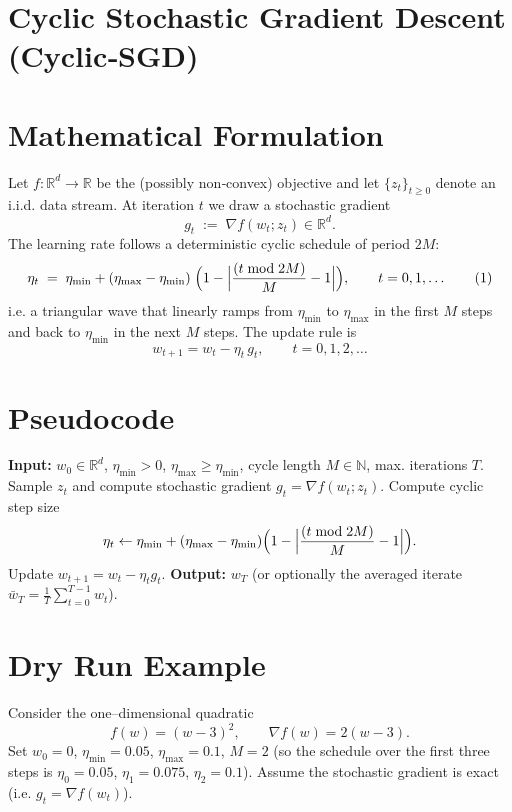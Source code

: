 \documentclass{article}
\newcommand{\RR}{\mathbb{R}}
\begin{document}
\section*{Cyclic Stochastic Gradient Descent (Cyclic‑SGD)}

\section*{Mathematical Formulation}
Let $f:\RR^{d}\rightarrow\RR$ be the (possibly non‑convex) objective and let 
$\{z_{t}\}_{t\ge0}$ denote an i.i.d. data stream.  
At iteration $t$ we draw a stochastic gradient
\[
g_{t}\;:=\;\nabla f(w_{t};z_{t})\in\RR^{d}.
\]
The learning rate follows a deterministic cyclic schedule of period $2M$:
\[
\eta_{t}\;=\;\eta_{\min}
   +(\eta_{\max}-\eta_{\min})\;
      \Bigl(1-\Bigl|\frac{(t\bmod 2M)}{M}-1\Bigr|\Bigr),
   \qquad t=0,1,\dots
\tag{1}
\]
i.e. a triangular wave that linearly ramps from $\eta_{\min}$ to $\eta_{\max}$
in the first $M$ steps and back to $\eta_{\min}$ in the next $M$ steps.
The update rule is
\[
w_{t+1}=w_{t}-\eta_{t}\,g_{t},\qquad t=0,1,2,\dots
\tag{2}
\]

\section*{Pseudocode}
\begin{algorithm}[H]
\caption{Cyclic‑SGD}
\begin{algorithmic}[1]
\STATE \textbf{Input:} $w_{0}\in\RR^{d}$, $\eta_{\min}>0$, $\eta_{\max}\ge\eta_{\min}$, cycle length $M\in\mathbb N$,
max. iterations $T$.
    \STATE Sample $z_{t}$ and compute stochastic gradient $g_{t}=\nabla f(w_{t};z_{t})$.
    \STATE Compute cyclic step size
    \[
    \eta_{t}\leftarrow \eta_{\min}+(\eta_{\max}-\eta_{\min})
                \Bigl(1-\Bigl|\frac{(t\bmod 2M)}{M}-1\Bigr|\Bigr).
    \]
    \STATE Update $w_{t+1}=w_{t}-\eta_{t} g_{t}$.
\ENDFOR
\STATE \textbf{Output:} $w_{T}$ (or optionally the averaged iterate $\bar w_T=\frac1T\sum_{t=0}^{T-1}w_{t}$).
\end{algorithmic}
\end{algorithm}

\section*{Dry Run Example}
Consider the one–dimensional quadratic
\[
f(w)=(w-3)^{2},\qquad \nabla f(w)=2(w-3).
\]
Set $w_{0}=0$, $\eta_{\min}=0.05$, $\eta_{\max}=0.1$, $M=2$ (so the schedule over the first three steps is
$\eta_{0}=0.05$, $\eta_{1}=0.075$, $\eta_{2}=0.1$).  
Assume the stochastic gradient is exact (i.e. $g_{t}=\nabla f(w_{t})$).
\end{document}
